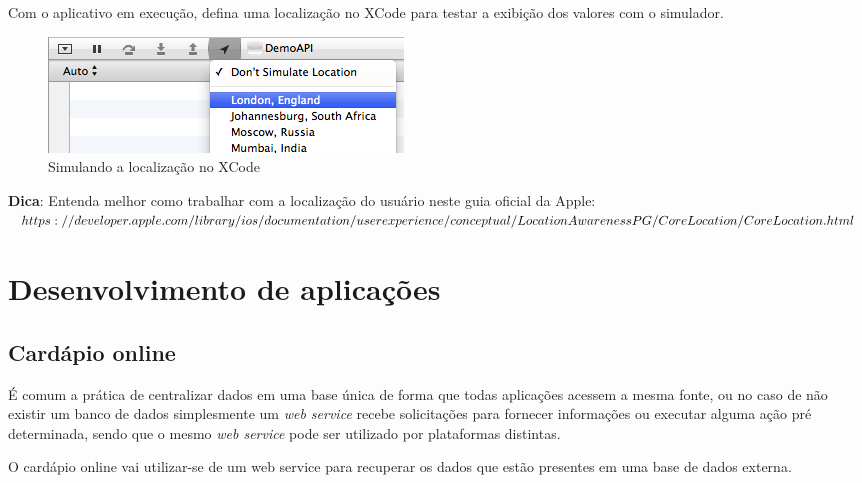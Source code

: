 \documentclass[a4paper,12pt,brazil,oneside]{book}
\begin{document}
Com o aplicativo em execução, defina uma localização no XCode para testar a exibição dos valores com o simulador.

\begin{figure}[H]
  \centering
  \includegraphics[width=.75\textwidth]{figuras/location.png}
  \caption{Simulando a localização no XCode}
  \label{fig:a}
\end{figure}

\begin{framed}

\textbf{Dica}: Entenda melhor como trabalhar com a localização do usuário neste guia oficial da Apple:\\
\(https://developer.apple.com/library/ios/documentation/userexperience/conceptual/\\LocationAwarenessPG/CoreLocation/CoreLocation.html\)
\end{framed}

\chapter{Desenvolvimento de aplicações}

\section{Cardápio online}
É comum a prática de centralizar dados em uma base única de forma que todas aplicações acessem a mesma fonte, ou no caso de não existir um banco de dados simplesmente um \emph{web service} recebe solicitações para fornecer informações ou executar alguma ação pré determinada, sendo que o mesmo \emph{web service} pode ser utilizado por plataformas distintas.

O cardápio online vai utilizar-se de um web service para recuperar os dados que estão presentes em uma base de dados externa.
\end{document}
